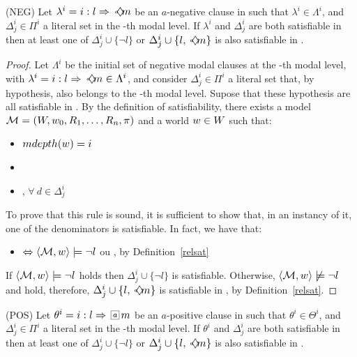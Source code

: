 \begin{lemma}{(NEG)} Let $\lambda^i = \cneg$ be an $a$-negative clause in 
    such that $\lambda^i \in \Lambda^i$, and $\Delta^i_j \in \Pi^i$ a literal
    set in the \ml-th modal level. If $\lambda^i$ and $\Delta^i_j$ are both
    satisfiable in  then at least one of $\Delta^i_j \cup
    \{\neg l\}$ or $\Delta^i_j \cup \{l, \pos{a}m\}$ is also satisfiable in
    .
\end{lemma}
\begin{proof}
   Let $\Lambda^i$ be the initial set of negative modal clauses at the \ml-th
   modal level, with $\lambda^i = \cneg \in \Lambda^i$, and consider $\Delta^i_j
   \in \Pi^i$ a literal set that, by hypothesis, also belongs to the \ml-th
   modal level. Supose that these hypothesis are all satisfiable in
   . By the definition of satisfiability, there exists a
   model $\Model = (W, \st_0, R_1, \ldots, R_n, \pi)$ and a world $\st \in W$
   such that:
   \begin{itemize}
       \item $mdepth(w) = \ml$ 
       \item {}
       \item {}, $\forall~d \in \Delta^i_j$
   \end{itemize}
   To prove that this rule is sound, it is sufficient to show that, in an
   instancy of it, one of the denominators is satisfiable. In fact, we have
   that:
   \begin{itemize}
       \item {} $\iff \sat{\Model}{\st}{\neg
           l}$ ou , by Definition~\ref{relsat}
   \end{itemize}
   If $\sat{\Model}{\st}{\neg l}$ holds then $\Delta^i_j \cup \{\neg l\}$ is
   satisfiable. Otherwise, $\langle \Model, \st \rangle \not \models \neg l$ and
    hold, therefore, $\Delta^i_j \cup \{l, \pos{a}
   m\}$ is satisfiable in , by Definition~\ref{relsat}. 
\end{proof}

\begin{lemma}{(POS)} Let $\theta^i = \cpos$ be an $a$-positive clause in 
    such that $\theta^i \in \Theta^i$, and $\Delta^i_j \in \Pi^i$ a literal
    set in the \ml-th modal level. If $\theta^i$ and $\Delta^i_j$ are both
    satisfiable in  then at least one of $\Delta^i_j \cup
    \{\neg l\}$ or $\Delta^i_j \cup \{l, \pos{a}m\}$ is also satisfiable in
    .
\end{lemma}

